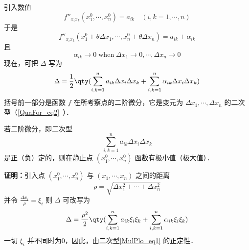 引入数值
\begin{equation}
f''_{x_ix_k}(x_1^0,\cdots,x_n^0)=a_{ik}\quad (i,k=1,\cdots,n)
\end{equation}
于是
\begin{equation}
f''_{x_ix_k}(x_1^0+\theta\Delta x_1,\cdots,x_n^0+\theta\Delta x_n)=a_{ik}+\alpha_{ik}
\end{equation}
且
\begin{equation}
\alpha_{ik}\rightarrow 0\;\mathrm{when}\;\Delta x_1\rightarrow0,\cdots,\Delta x_n\rightarrow0
\end{equation}
现在，可把 $\Delta$ 写为
\begin{equation}
\Delta=\frac{1}{2}\qty(\sum_{i,k=1}^na_{ik}\Delta x_i\Delta x_k+\sum_{i,k=1}^n\alpha_{ik}\Delta x_i\Delta x_k )
\end{equation}
括号前一部分是函数 $f$ 在所考察点的二阶微分，它是变元为 $\Delta x_1,\cdots,\Delta x_n$ 的二次型（\autoref{QuaFor_eq2}~）．
\begin{theorem}{}
若二阶微分，即二次型
\begin{equation}\label{MulPlo_eq1}
\sum_{i,k=1}^na_{ik}\Delta x_i\Delta x_k
\end{equation}
是正（负）定的，则在静止点 $(x_1^0,\cdots,x_n^0)$ 函数有极小值（极大值）．
\end{theorem}
\textbf{证明：}引入点 $(x_1^0,\cdots,x_n^0)$ 与 $(x_1,\cdots,x_n)$ 之间的距离
\begin{equation}
\rho=\sqrt{\Delta x_1^2+\cdots+\Delta x_n^2}
\end{equation}
 并令 $\frac{\Delta x_i}{\rho}=\xi_i$
 则 $\Delta$ 可改写为
 \begin{equation}\label{MulPlo_eq2}
 \Delta=\frac{\rho^2}{2}\qty(\sum_{i,k=1}^na_{ik}\xi_i\xi_k+\sum_{i,k=1}^n\alpha_{ik} \xi_i\xi_k)
 \end{equation}
 一切 $\xi_i$ 并不同时为0，因此，由二次型\autoref{MulPlo_eq1} 的正定性．